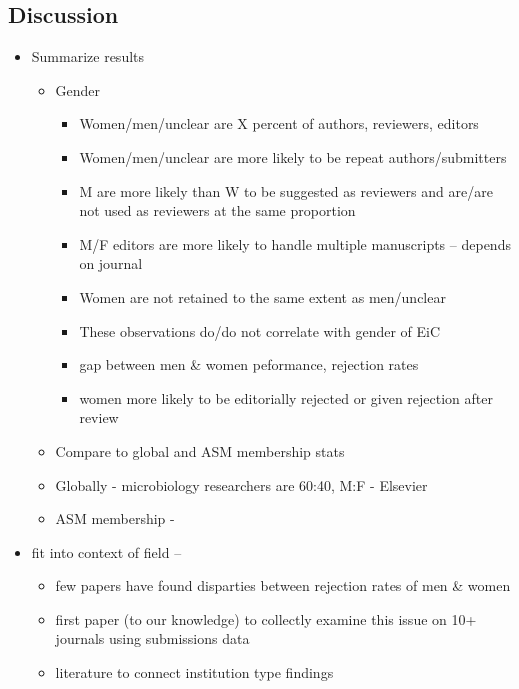 \documentclass[11pt,]{article}
\providecommand{\tightlist}{%
  \setlength{\itemsep}{0pt}\setlength{\parskip}{0pt}}
\begin{document}
\subsection{Discussion}\label{discussion}

\begin{itemize}
\tightlist
\item
  Summarize results

  \begin{itemize}
  \tightlist
  \item
    Gender

    \begin{itemize}
    \tightlist
    \item
      Women/men/unclear are X percent of authors, reviewers, editors
    \item
      Women/men/unclear are more likely to be repeat authors/submitters
    \item
      M are more likely than W to be suggested as reviewers and are/are
      not used as reviewers at the same proportion
    \item
      M/F editors are more likely to handle multiple manuscripts --
      depends on journal
    \item
      Women are not retained to the same extent as men/unclear
    \item
      These observations do/do not correlate with gender of EiC
    \item
      gap between men \& women peformance, rejection rates
    \item
      women more likely to be editorially rejected or given rejection
      after review
    \end{itemize}
  \item
    Compare to global and ASM membership stats
  \item
    Globally - microbiology researchers are 60:40, M:F - Elsevier
  \item
    ASM membership -
  \end{itemize}
\item
  fit into context of field --

  \begin{itemize}
  \tightlist
  \item
    few papers have found disparties between rejection rates of men \&
    women
  \item
    first paper (to our knowledge) to collectly examine this issue on
    10+ journals using submissions data
  \item
    literature to connect institution type findings


\end{itemize}
\end{itemize}
\end{document}
